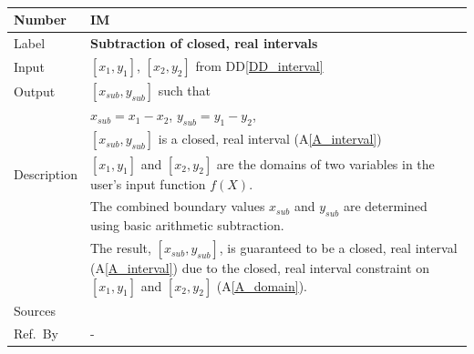 \documentclass[12pt]{article}
\newcommand{\colAwidth}{0.13\textwidth}
\newcommand{\colBwidth}{0.82\textwidth}
\newcommand{\ddref}[1]{DD\ref{#1}}
\newcommand{\aref}[1]{A\ref{#1}}
\newcounter{instnum} %
\begin{document}
~\newline

\noindent
\begin{minipage}{\textwidth}
	\renewcommand*{\arraystretch}{1.5}
	\begin{tabular}{| p{\colAwidth} | p{\colBwidth}|}
		\hline
		\rowcolor[gray]{0.9}
		Number& IM{instnum}\theinstnum \label{I_subtraction}\\
		\hline
		Label& \bf Subtraction of closed, real intervals\\
		\hline
		Input&$[x_{1}, y_{1}]$, $[x_{2}, y_{2}]$ from \ddref{DD_interval}\\
		\hline
		Output&$[x_{sub}, y_{sub}]$ such that\\
		&$x_{sub} = x_{1} - x_{2}$, $y_{sub} = y_{1} - y_{2}$,\\
		&$[x_{sub}, y_{sub}]$ is a closed, real interval (\aref{A_interval}) \\
		\hline
		Description&$[x_{1}, y_{1}]$ and $[x_{2}, y_{2}]$ are the domains of 
		two variables in the user's input function $f(X)$. \\
		&The combined boundary values $x_{sub}$ and  $y_{sub}$ are determined 
		using basic arithmetic subtraction.\\
		& The result, $[x_{sub}, y_{sub}]$, is guaranteed to be a closed, real 
		interval (\aref{A_interval}) due to the closed, real interval 
		constraint on $[x_{1}, y_{1}]$ and $[x_{2}, y_{2}]$ (\aref{A_domain}).
		\\
		\hline
		Sources& ~\cite{intervalarithmetic} \ \\
		\hline
		Ref.\ By & -\\
		\hline
	\end{tabular}
\end{minipage}\\

~\newline
\end{document}
